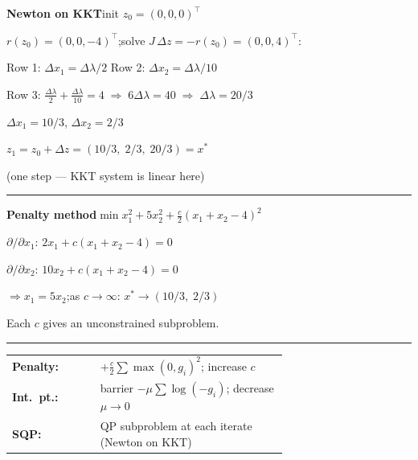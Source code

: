 \documentclass[10pt]{article}
\begin{document}
\begin{minipage}[t]{0.49\textwidth}\vspace{0pt}

  \textbf{Newton on KKT}\quad init $z_0=(0,0,0)^\top$

  $r(z_0)=(0,0,-4)^\top$;\quad solve $J\,\Delta z=-r(z_0)=(0,0,4)^\top$:

  Row 1: $\Delta x_1=\Delta\lambda/2$\quad
  Row 2: $\Delta x_2=\Delta\lambda/10$

  Row 3: $\tfrac{\Delta\lambda}{2}+\tfrac{\Delta\lambda}{10}=4
    \;\Rightarrow\;6\Delta\lambda=40\;\Rightarrow\;\Delta\lambda=20/3$

  $\Delta x_1=10/3$,\; $\Delta x_2=2/3$

  $z_1=z_0+\Delta z=(10/3,\;2/3,\;20/3)=x^*$

  (one step — KKT system is linear here)

  \medskip\hrule\medskip

  \textbf{Penalty method}\quad $\min x_1^2+5x_2^2+\tfrac{c}{2}(x_1+x_2-4)^2$

  $\partial/\partial x_1$: $2x_1+c(x_1+x_2-4)=0$

  $\partial/\partial x_2$: $10x_2+c(x_1+x_2-4)=0$

  $\Rightarrow x_1=5x_2$;\quad as $c\to\infty$: $x^*\to(10/3,\;2/3)$

  Each $c$ gives an unconstrained subproblem.

  \medskip\hrule\medskip

  \begin{tabular}{@{}lp{0.68\linewidth}@{}}
    \textbf{Penalty:} & $+\tfrac{c}{2}\sum\max(0,g_i)^2$; increase $c$ \\[2pt]
    \textbf{Int.\ pt.:} & barrier $-\mu\sum\log(-g_i)$; decrease $\mu\to0$ \\[2pt]
    \textbf{SQP:} & QP subproblem at each iterate (Newton on KKT) \\
  \end{tabular}

\end{minipage}

\newpage

\end{document}
